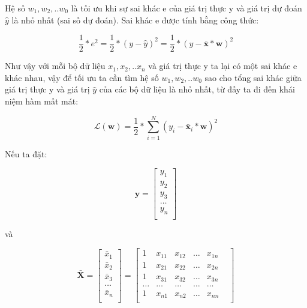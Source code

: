 \documentclass[12pt,letterpaper]{article}
\begin{document}
    Hệ số $w_1, w_2,.. w_0$ là tối ưu khi sự sai khác e của giá trị thực y và giá trị dự đoán $\hat{y}$ là nhỏ nhất (sai số dự đoán). Sai khác e được tính bằng công thức:
        
        $$
        \frac{1}{2} * e^2 
        = 
        \frac{1}{2} * (y - \hat{y})^2 
        = 
        \frac{1}{2} * (y - \bar{\textbf{x}}*\textbf{w})^2
        $$
        
    Như vậy với mỗi bộ dữ liệu $x_1, x_2,.. x_n $ và giá trị thực y ta lại có một sai khác e khác nhau, vậy để tối ưu ta cần tìm hệ số $w_1, w_2,.. w_0$ sao cho tổng sai khác giữa giá trị thực y và giá trị $\hat{y}$ của các bộ dữ liệu là nhỏ nhất, từ đấy ta đi đến khái niệm hàm mất mát:
        
        $$ 
        \mathcal{L}(\textbf{w}) 
        = 
        \frac{1}{2} * \sum_{i=1}^N (y_i - \bar{\textbf{x}}_i*\textbf{w})^2 
        $$
        
    Nếu ta đặt:
    
        $$
        \textbf{y} 
        =
        \begin{bmatrix}
        y_1 \\ y_2 \\ y_3 \\ \dots  \\ y_n \\
        \end{bmatrix}
        $$
    
    và
    
        $$
        \bar{\textbf{X}} 
        =  
        \begin{bmatrix}
        \bar{x}_1 \\ 
        \bar{x}_2 \\
        \bar{x}_3 \\ 
        \dots  \\ 
        \bar{x}_n \\
        \end{bmatrix}
        = 
        \begin{bmatrix}
        1 & x_{1 1} & x_{1 2} & \dots & x_{1 n} \\
        1 & x_{2 1} & x_{2 2} & \dots & x_{2 n} \\
        1 & x_{3 1} & x_{3 2} & \dots & x_{3 n} \\
        \dots & \dots & \dots & \dots & \dots & \\
        1 & x_{n 1} & x_{n 2} & \dots & x_{n n} \\
        \end{bmatrix}
        $$
        
\end{document}
